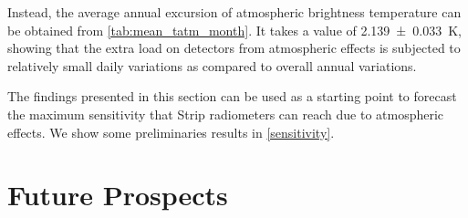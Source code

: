 Instead, the average annual excursion of atmospheric brightness temperature
can be obtained from \autoref{tab:mean_tatm_month}. It takes a value of
\SI{2.139 \pm 0.033}{\kelvin}, showing that the extra load on detectors
from atmospheric effects is subjected to relatively small daily variations
as compared to overall annual variations.

The findings presented in this section can be used as a starting point to
forecast the maximum sensitivity that Strip radiometers can reach due to
atmospheric effects.  We show some preliminaries results in
\autoref{sensitivity}.

\section{Future Prospects}
